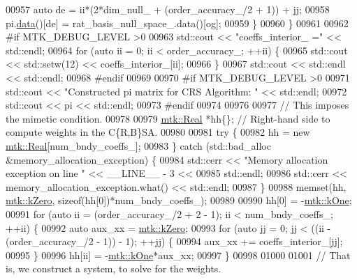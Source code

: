 \begin{DoxyCode}
{{00957       \textcolor{keyword}{auto} de = ii*(2*dim\_null\_ + (order\_accuracy\_/2 + 1)) + jj;
00958       pi.\hyperlink{classmtk_1_1DenseMatrix_a0c33b8a9e01d157c61ddbdf807c25d84}{data}()[de] = rat\_basis\_null\_space\_.data()[og];
00959     \}
00960   \}
00961 
00962 \textcolor{preprocessor}{  #if MTK\_DEBUG\_LEVEL >0}
00963   std::cout << \textcolor{stringliteral}{"coeffs\_interior\_ ="} << std::endl;
00964   \textcolor{keywordflow}{for} (\textcolor{keyword}{auto} ii = 0; ii < order\_accuracy\_; ++ii) \{
00965     std::cout << std::setw(12) << coeffs\_interior\_[ii];
00966   \}
00967   std::cout << std::endl << std::endl;
00968 \textcolor{preprocessor}{  #endif}
00969 
00970 \textcolor{preprocessor}{  #if MTK\_DEBUG\_LEVEL >0}
00971   std::cout << \textcolor{stringliteral}{"Constructed pi matrix for CRS Algorithm: "} << std::endl;
00972   std::cout << pi << std::endl;
00973 \textcolor{preprocessor}{  #endif}
00974 
00976 
00977   \textcolor{comment}{// This imposes the mimetic condition.}
00978 
00979   \hyperlink{group__c01-roots_gac080bbbf5cbb5502c9f00405f894857d}{mtk::Real} *hh\{\};  \textcolor{comment}{// Right-hand side to compute weights in the C\{R,B\}SA.}
00980 
00981   \textcolor{keywordflow}{try} \{
00982     hh = \textcolor{keyword}{new} \hyperlink{group__c01-roots_gac080bbbf5cbb5502c9f00405f894857d}{mtk::Real}[num\_bndy\_coeffs\_];
00983   \} \textcolor{keywordflow}{catch} (std::bad\_alloc &memory\_allocation\_exception) \{
00984     std::cerr << \textcolor{stringliteral}{"Memory allocation exception on line "} << \_\_LINE\_\_ - 3 <<
00985       std::endl;
00986     std::cerr << memory\_allocation\_exception.what() << std::endl;
00987   \}
00988   memset(hh, \hyperlink{group__c01-roots_ga59a451a5fae30d59649bcda274fea271}{mtk::kZero}, \textcolor{keyword}{sizeof}(hh[0])*num\_bndy\_coeffs\_);
00989 
00990   hh[0] = -\hyperlink{group__c01-roots_ga26407c24d43b6b95480943340d285c71}{mtk::kOne};
00991   \textcolor{keywordflow}{for} (\textcolor{keyword}{auto} ii = (order\_accuracy\_/2 + 2 - 1); ii < num\_bndy\_coeffs\_; ++ii) \{
00992     \textcolor{keyword}{auto} aux\_xx = \hyperlink{group__c01-roots_ga59a451a5fae30d59649bcda274fea271}{mtk::kZero};
00993     \textcolor{keywordflow}{for} (\textcolor{keyword}{auto} jj = 0; jj < ((ii - (order\_accuracy\_/2 - 1)) - 1); ++jj) \{
00994       aux\_xx += coeffs\_interior\_[jj];
00995     \}
00996     hh[ii] = -\hyperlink{group__c01-roots_ga26407c24d43b6b95480943340d285c71}{mtk::kOne}*aux\_xx;
00997   \}
00998 
01000 
01001   \textcolor{comment}{// That is, we construct a system, to solve for the weights.}
}}
\end{DoxyCode}
